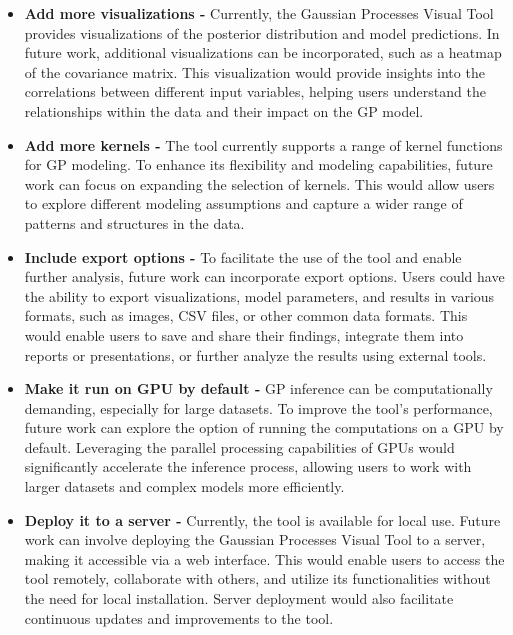\documentclass[preprint,journal]{vgtc}       %
\begin{document}
\begin{itemize}
  \item \textbf{Add more visualizations -} Currently, the Gaussian Processes Visual Tool provides visualizations of the posterior distribution and model predictions. In future work, additional visualizations can be incorporated, such as a heatmap of the covariance matrix. This visualization would provide insights into the correlations between different input variables, helping users understand the relationships within the data and their impact on the GP model.

  \item \textbf{Add more kernels -} The tool currently supports a range of kernel functions for GP modeling. To enhance its flexibility and modeling capabilities, future work can focus on expanding the selection of kernels. This would allow users to explore different modeling assumptions and capture a wider range of patterns and structures in the data.
  
  \item \textbf{Include export options -} To facilitate the use of the tool and enable further analysis, future work can incorporate export options. Users could have the ability to export visualizations, model parameters, and results in various formats, such as images, CSV files, or other common data formats. This would enable users to save and share their findings, integrate them into reports or presentations, or further analyze the results using external tools.

  \item \textbf{Make it run on GPU by default -} GP inference can be computationally demanding, especially for large datasets. To improve the tool's performance, future work can explore the option of running the computations on a GPU by default. Leveraging the parallel processing capabilities of GPUs would significantly accelerate the inference process, allowing users to work with larger datasets and complex models more efficiently.
  
  \item \textbf{Deploy it to a server -} Currently, the tool is available for local use. Future work can involve deploying the Gaussian Processes Visual Tool to a server, making it accessible via a web interface. This would enable users to access the tool remotely, collaborate with others, and utilize its functionalities without the need for local installation. Server deployment would also facilitate continuous updates and improvements to the tool.


\end{itemize}
\end{document}
